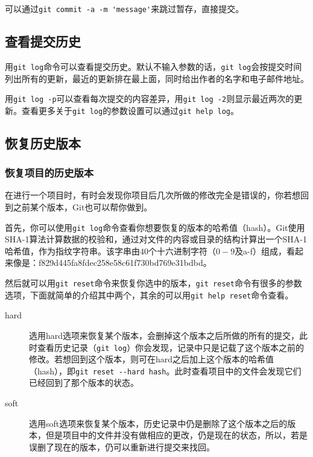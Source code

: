 \documentclass[a4paper,12pt]{article}
\begin{document}
可以通过\lstinline|git commit -a -m 'message'|来跳过暂存，直接提交。

\subsection{查看提交历史}

用\lstinline|git log|命令可以查看提交历史。默认不输入参数的话，\lstinline|git log|会按提交时间列出所有的更新，最近的更新排在最上面，同时给出作者的名字和电子邮件地址。

用\lstinline|git log -p|可以查看每次提交的内容差异，用\lstinline|git log -2|则显示最近两次的更新。查看更多关于\lstinline|git log|的参数设置可以通过\lstinline|git help log|。

\subsection{恢复历史版本}
\subsubsection{恢复项目的历史版本}

在进行一个项目时，有时会发现你项目后几次所做的修改完全是错误的，你若想回到之前某个版本，Git也可以帮你做到。

首先，你可以使用\lstinline|git log|命令查看你想要恢复的版本的哈希值（hash）。Git使用SHA-1算法计算数据的校验和，通过对文件的内容或目录的结构计算出一个SHA-1哈希值，作为指纹字符串。该字串由$40$个十六进制字符（$0-9$及a-f）组成，看起来像是：f829d445fa8fdec258e58c61f730bd769e31bdbd。

然后就可以用\lstinline|git reset|命令来恢复你选中的版本，\lstinline|git reset|命令有很多的参数选项，下面就简单的介绍其中两个，其余的可以用\lstinline|git help reset|命令查看。

\begin{description}
\item[hard] 选用hard选项来恢复某个版本，会删掉这个版本之后所做的所有的提交，此时查看历史记录（\lstinline|git log|）你会发现，记录中只是记载了这个版本之前的修改。若想回到这个版本，则可在hard之后加上这个版本的哈希值（hash），即\lstinline|git reset --hard hash|。此时查看项目中的文件会发现它们已经回到了那个版本的状态。
\item[soft] 选用soft选项来恢复某个版本，历史记录中仍是删除了这个版本之后的版本，但是项目中的文件并没有做相应的更改，仍是现在的状态，所以，若是误删了现在的版本，仍可以重新进行提交来找回。
\end{description}
\end{document}
